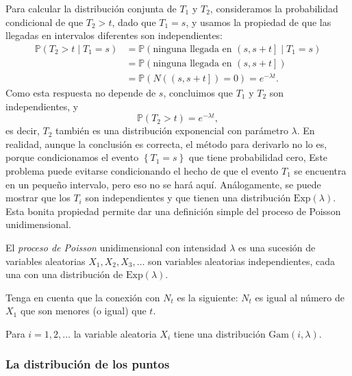 	Para calcular la distribución conjunta de $T_{1}$ y $T_{2}$, consideramos la probabilidad condicional de que $T_{2}>t$, dado que $T_{1}=s$, y usamos la propiedad de que las llegadas en intervalos diferentes son independientes:
	\begin{align*}
		\mathds{P}\left(T_{2}>t\mid T_{1}=s\right)
		&=\mathds{P}\left(\text{ninguna llegada en }\left(s,s+t\right]\mid T_{1}=s\right)\\
		&=\mathds{P}\left(\text{ninguna llegada en }\left(s,s+t\right]\right)\\
		&=\mathds{P}\left(N\left(\left(s,s+t\right]\right)=0\right)=e^{-\lambda t}.
	\end{align*}
	Como esta respuesta no depende de $s$, concluimos que $T_{1}$ y $T_{2}$ son independientes, y
	\[
		\mathds{P}\left(T_{2}>t\right)=e^{-\lambda t},
	\]
	es decir, $T_{2}$ también es una distribución exponencial con parámetro $\lambda$. En realidad, aunque la conclusión es correcta, el método para derivarlo no lo es, porque condicionamos el evento $\left\{T_{1}=s\right\}$ que tiene probabilidad cero, Este problema puede evitarse condicionando el hecho de que el evento $T_{1}$ se encuentra en un pequeño intervalo, pero eso no se hará aquí. Análogamente, se puede mostrar que los $T_{i}$ son independientes y que tienen una distribución $\mathrm{Exp}\left(\lambda\right)$. Esta bonita propiedad permite dar una definición simple del proceso de Poisson unidimensional.
	\begin{definition}
		El \textit{proceso de Poisson} unidimensional con intensidad $\lambda$ es una sucesión de variables aleatorias $X_{1},X_{2},X_{3},\ldots$ son variables aleatorias independientes, cada una con una distribución de $\mathrm{Exp}\left(\lambda\right)$.
	\end{definition}
	Tenga en cuenta que la conexión con $N_{t}$ es la siguiente: $N_{t}$ es igual al número de $X_{1}$ que son menores (o igual) que $t$.
	\begin{definition}
		Para $i=1,2,\ldots$ la variable aleatoria $X_{i}$ tiene una distribución $\mathrm{Gam}\left(i,\lambda\right)$.
	\end{definition}

\subsubsection{La distribución de los puntos}

